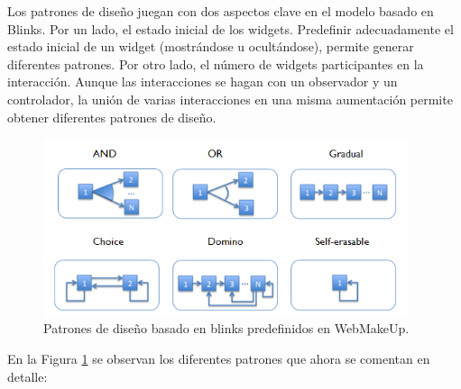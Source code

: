 Los patrones de diseño juegan con dos aspectos clave en el modelo basado en Blinks. Por un lado, el estado inicial de los widgets. Predefinir adecuadamente el estado inicial de un widget (mostrándose u ocultándose), permite generar diferentes patrones. Por otro lado, el número de widgets participantes en la interacción. Aunque las interacciones se hagan con un observador y un controlador, la unión de varias interacciones en una misma aumentación permite obtener diferentes patrones de diseño.

\begin{figure}
\begin{center}
\includegraphics[width=0.95\textwidth]{figs/4-PatronesBlinks.png}
\caption{Patrones de diseño basado en blinks predefinidos en WebMakeUp.}
\label{fig:PatronesBlink}
\end{center}
\end{figure}

En la Figura \ref{fig:PatronesBlink} se observan los diferentes patrones que ahora se comentan en detalle:

